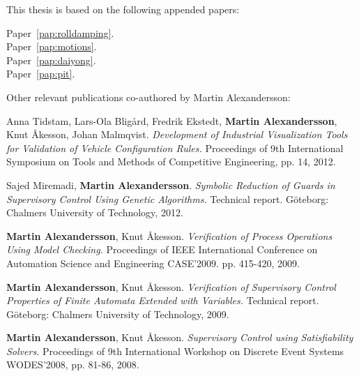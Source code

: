
\begin{refsection}

This thesis is based on the following appended papers:

\begin{description}
\item[Paper~\ref{pap:rolldamping}.]

\item[Paper~\ref{pap:motions}.] 

\item[Paper~\ref{pap:daiyong}.] 

\item[Paper~\ref{pap:pit}.] 

\end{description}

\vspace{1cm}

\noindent Other relevant publications co-authored by Martin Alexandersson:
\begin{description}
\normalsize
\newcommand{\ME}{{\bfseries Martin Alexandersson}}

\item Anna Tidstam, Lars-Ola Bligård, Fredrik Ekstedt, \ME, Knut Åkesson, Johan Malmqvist. \emph{Development of Industrial Visualization Tools for Validation of Vehicle Configuration Rules.} Proceedings of 9th International Symposium on Tools and Methods of Competitive Engineering, pp. 14, 2012.

\item Sajed Miremadi, \ME. \emph{Symbolic Reduction of Guards in Supervisory Control Using Genetic Algorithms.} Technical report. Göteborg: Chalmers University of Technology, 2012.

\item \ME, Knut Åkesson. \emph{Verification of Process Operations Using Model Checking.} Proceedings of IEEE International Conference on Automation Science and Engineering CASE'2009. pp. 415-420, 2009.

\item \ME, Knut Åkesson. \emph{Verification of Supervisory Control Properties of Finite Automata Extended with Variables.} Technical report. Göteborg: Chalmers University of Technology, 2009.

\item \ME, Knut Åkesson. \emph{Supervisory Control using Satisfiability Solvers.} Proceedings of 9th International Workshop on Discrete Event Systems WODES'2008, pp. 81-86, 2008.
\end{description}

\end{refsection}
